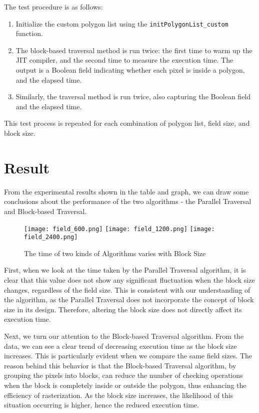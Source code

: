 \documentclass[
	a4paper, %
	10pt, %
	unnumberedsections, %
	twoside, %
]{LTJournalArticle}
\begin{document}
The test procedure is as follows:

\begin{enumerate}
    \item Initialize the custom polygon list using the \texttt{initPolygonList\_custom} function.
    
    \item The block-based traversal method is run twice: the first time to warm up the JIT compiler, and the second time to measure the execution time. The output is a Boolean field indicating whether each pixel is inside a polygon, and the elapsed time.
    
    \item Similarly, the traversal method is run twice, also capturing the Boolean field and the elapsed time.
\end{enumerate}

This test process is repeated for each combination of polygon list, field size, and block size.

\section{Result}

From the experimental results shown in the table and graph, we can draw some conclusions about the performance of the two algorithms - the Parallel Traversal and Block-based Traversal.

\begin{figure}[H] %
	\texttt{[image: field\_600.png]}
	\texttt{[image: field\_1200.png]}
	\texttt{[image: field\_2400.png]}
	\caption{The time of two kinds of Algorithms varies with Block Size}
\end{figure}

First, when we look at the time taken by the Parallel Traversal algorithm, it is clear that this value does not show any significant fluctuation when the block size changes, regardless of the field size. This is consistent with our understanding of the algorithm, as the Parallel Traversal does not incorporate the concept of block size in its design. Therefore, altering the block size does not directly affect its execution time.

Next, we turn our attention to the Block-based Traversal algorithm. From the data, we can see a clear trend of decreasing execution time as the block size increases. This is particularly evident when we compare the same field sizes. The reason behind this behavior is that the Block-based Traversal algorithm, by grouping the pixels into blocks, can reduce the number of checking operations when the block is completely inside or outside the polygon, thus enhancing the efficiency of rasterization. As the block size increases, the likelihood of this situation occurring is higher, hence the reduced execution time.
\end{document}
